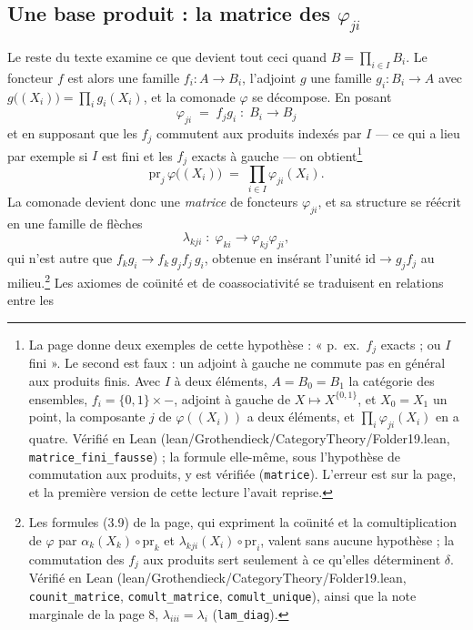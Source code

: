 \documentclass[11pt,a4paper]{article}
\begin{document}
\subsection*{Une base produit : la matrice des $\varphi_{ji}$}

Le reste du texte examine ce que devient tout ceci quand
$B = \prod_{i \in I} B_{i}$. Le foncteur $f$ est alors une famille
$f_{i} : A \to B_{i}$, l'adjoint $g$ une famille $g_{i} : B_{i} \to A$ avec
$g\bigl( (X_{i}) \bigr) = \prod_{i} g_{i}(X_{i})$, et la comonade $\varphi$ se
décompose. En posant
\[
  \varphi_{ji} \;=\; f_{j} g_{i} \;:\; B_{i} \longrightarrow B_{j}
\]
et en supposant que les $f_{j}$ commutent aux produits indexés par $I$ — ce qui
a lieu par exemple si $I$ est fini et les $f_{j}$ exacts à gauche — on
obtient\footnote{La page donne deux exemples de cette hypothèse : « p.~ex.\
$f_{j}$ exacts ; ou $I$ fini ». Le second est faux : un adjoint à gauche ne
commute pas en général aux produits finis. Avec $I$ à deux éléments,
$A = B_{0} = B_{1}$ la catégorie des ensembles, $f_{i} = \{0,1\} \times -$,
adjoint à gauche de $X \mapsto X^{\{0,1\}}$, et $X_{0} = X_{1}$ un point, la
composante $j$ de $\varphi((X_{i}))$ a deux éléments, et
$\prod_{i} \varphi_{ji}(X_{i})$ en a quatre. Vérifié en Lean
(lean/Grothendieck/CategoryTheory/Folder19.lean, \texttt{matrice\_fini\_fausse}) ; la formule
elle-même, sous l'hypothèse de commutation aux produits, y est vérifiée
(\texttt{matrice}). L'erreur est sur la page, et la première version de cette
lecture l'avait reprise.}
\[
  \mathrm{pr}_{j}\, \varphi\bigl( (X_{i}) \bigr)
  \;=\; \prod_{i \in I} \varphi_{ji}(X_{i}) .
\]
La comonade devient donc une \emph{matrice} de foncteurs $\varphi_{ji}$, et sa
structure se réécrit en une famille de flèches
\[
  \lambda_{kji} \;:\; \varphi_{ki} \longrightarrow \varphi_{kj}\varphi_{ji} ,
\]
qui n'est autre que $f_{k} g_{i} \to f_{k}\, g_{j} f_{j}\, g_{i}$, obtenue en
insérant l'unité $\mathrm{id} \to g_{j} f_{j}$ au milieu.\footnote{Les
formules (3.9) de la page, qui expriment la coünité et la comultiplication de
$\varphi$ par $\alpha_{k}(X_{k}) \circ \mathrm{pr}_{k}$ et
$\lambda_{kji}(X_{i}) \circ \mathrm{pr}_{i}$, valent sans aucune hypothèse ; la
commutation des $f_{j}$ aux produits sert seulement à ce qu'elles déterminent
$\delta$. Vérifié en Lean (lean/Grothendieck/CategoryTheory/Folder19.lean,
\texttt{counit\_matrice}, \texttt{comult\_matrice}, \texttt{comult\_unique}),
ainsi que la note marginale de la page 8, $\lambda_{iii} = \lambda_{i}$
(\texttt{lam\_diag}).} Les axiomes de
coünité et de coassociativité se traduisent en relations entre les
\end{document}
